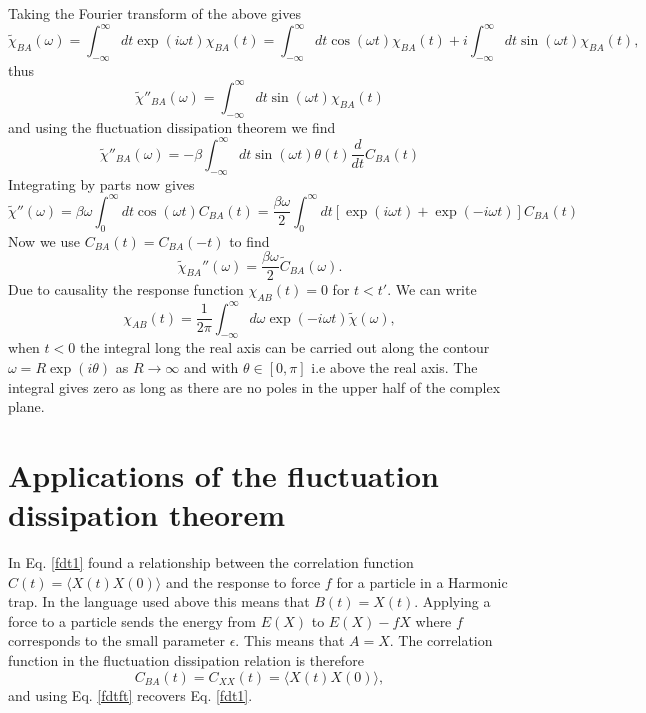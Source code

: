 \documentclass[11pt]{report}
\begin{document}
Taking the Fourier transform of the above gives
\begin{equation}
\tilde \chi_{BA}(\omega)=\int_{-\infty}^{\infty} dt \exp(i\omega t) \chi_{BA}(t) = \int_{-\infty}^{\infty} dt \cos(\omega t) \chi_{BA}(t) + i\int_{-\infty}^{\infty} dt \sin(\omega t) \chi_{BA}(t),
\end{equation}
thus
\begin{equation}
\tilde \chi''_{BA}(\omega) = \int_{-\infty}^{\infty} dt \sin(\omega t) \chi_{BA}(t) 
\end{equation}
and using the fluctuation dissipation theorem we find
\begin{equation}
\tilde \chi''_{BA}(\omega) = -\beta \int_{-\infty}^{\infty} dt \sin(\omega t)  \theta(t)\frac{d}{dt}C_{BA}(t)
\end{equation}
Integrating by parts now gives
\begin{equation}
\tilde \chi''(\omega) = \beta\omega \int_0^\infty dt \cos(\omega t) C_{BA}(t)= \frac{\beta\omega}{2} \int_0^\infty dt \left[ \exp(i\omega t)+\exp(-i\omega t)\right]  C_{BA}(t)
\end{equation}
Now we use $C_{BA}(t)= C_{BA}(-t)$ to find
\begin{equation}
\boxed{
\tilde \chi_{BA}''(\omega) = \frac{\beta\omega}{2}\tilde C_{BA}(\omega)}.\label{fdtft}
\end{equation}
Due to causality the response function $\chi_{AB}(t)=0$ for $t<t'$. We can write
\begin{equation}
\chi_{AB}(t) =\frac{1}{2\pi}\int_{-\infty}^\infty d\omega \exp(-i\omega t) \tilde \chi(\omega),
\end{equation}
when $t<0$ the integral long the real axis can be carried out along the contour $\omega=R\exp(i\theta)$ as $R\to \infty$ and with $\theta\in[0,\pi]$ i.e above the real axis. The integral gives zero as long as there are no poles in the upper half of the complex plane.

\section{Applications of the fluctuation dissipation theorem}
In Eq. \eqref{fdt1} found a relationship between the correlation function $C(t) = \langle X(t) X(0)\rangle$ and the response to force $f$ for a particle in a Harmonic trap. In the language used above this means that $B(t)=X(t)$. Applying a force to a particle sends the energy
from $E(X)$ to $E(X)-fX$ where $f$ corresponds to the small parameter $\epsilon$. This means that $A=X$. The correlation function in the fluctuation dissipation relation is therefore
\begin{equation}
C_{BA}(t) = C_{XX}(t) = \langle X(t) X(0)\rangle,
\end{equation}
and using Eq. \eqref{fdtft} recovers Eq. \eqref{fdt1}.
\end{document}
